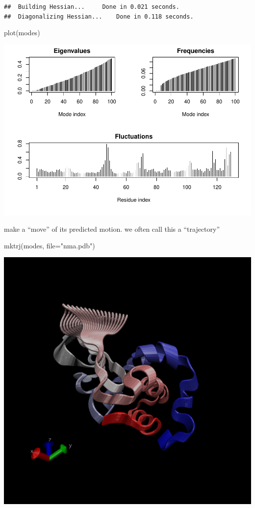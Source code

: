 \documentclass[
]{article}
\newenvironment{Shaded}{\begin{snugshade}}{\end{snugshade}}
\newcommand{\AttributeTok}[1]{\textcolor[rgb]{0.77,0.63,0.00}{#1}}
\newcommand{\FunctionTok}[1]{\textcolor[rgb]{0.00,0.00,0.00}{#1}}
\newcommand{\NormalTok}[1]{#1}
\newcommand{\StringTok}[1]{\textcolor[rgb]{0.31,0.60,0.02}{#1}}
\begin{document}
\begin{verbatim}
##  Building Hessian...     Done in 0.021 seconds.
##  Diagonalizing Hessian...    Done in 0.118 seconds.
\end{verbatim}

\begin{Shaded}
\begin{Highlighting}[]
\FunctionTok{plot}\NormalTok{(modes)}
\end{Highlighting}
\end{Shaded}

\includegraphics{class-12_files/figure-latex/unnamed-chunk-2-1.pdf}

make a ``move'' of its predicted motion. we often call this a
``trajectory''

\begin{Shaded}
\begin{Highlighting}[]
\FunctionTok{mktrj}\NormalTok{(modes, }\AttributeTok{file=}\StringTok{"nma.pdb"}\NormalTok{)}
\end{Highlighting}
\end{Shaded}

\includegraphics{vmdscene.bmp}
\end{document}
